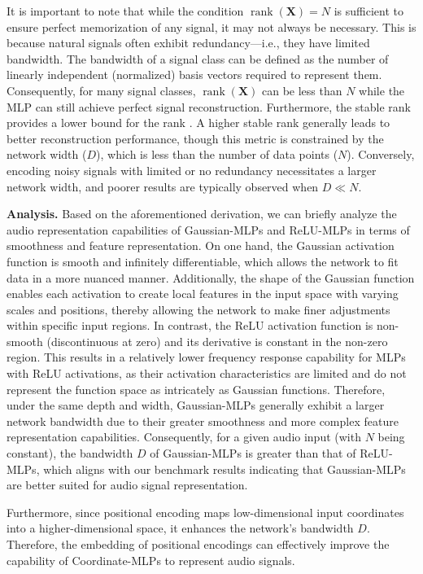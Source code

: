 \documentclass[letterpaper]{article} %
\begin{document}
It is important to note that while the condition \(\operatorname{rank}(\mathbf{X}) = N\) is sufficient to ensure perfect memorization of any signal, it may not always be necessary. This is because natural signals often exhibit redundancy—i.e., they have limited bandwidth. The bandwidth of a signal class can be defined as the number of linearly independent (normalized) basis vectors required to represent them. Consequently, for many signal classes, \(\operatorname{rank}(\mathbf{X})\) can be less than \(N\) while the MLP can still achieve perfect signal reconstruction. Furthermore, the stable rank provides a lower bound for the rank \cite{Rudelson2007rank}. A higher stable rank generally leads to better reconstruction performance, though this metric is constrained by the network width (\(D\)), which is less than the number of data points (\(N\)). Conversely, encoding noisy signals with limited or no redundancy necessitates a larger network width, and poorer results are typically observed when \(D \ll N\).

\textbf{Analysis.} Based on the aforementioned derivation, we can briefly analyze the audio representation capabilities of Gaussian-MLPs and ReLU-MLPs in terms of smoothness and feature representation. On one hand, the Gaussian activation function is smooth and infinitely differentiable, which allows the network to fit data in a more nuanced manner. Additionally, the shape of the Gaussian function enables each activation to create local features in the input space with varying scales and positions, thereby allowing the network to make finer adjustments within specific input regions. In contrast, the ReLU activation function is non-smooth (discontinuous at zero) and its derivative is constant in the non-zero region. This results in a relatively lower frequency response capability for MLPs with ReLU activations, as their activation characteristics are limited and do not represent the function space as intricately as Gaussian functions. Therefore, under the same depth and width, Gaussian-MLPs generally exhibit a larger network bandwidth due to their greater smoothness and more complex feature representation capabilities. Consequently, for a given audio input (with \( N \) being constant), the bandwidth \( D \) of Gaussian-MLPs is greater than that of ReLU-MLPs, which aligns with our benchmark results indicating that Gaussian-MLPs are better suited for audio signal representation.

Furthermore, since positional encoding maps low-dimensional input coordinates into a higher-dimensional space, it enhances the network's bandwidth $D$. Therefore, the embedding of positional encodings can effectively improve the capability of Coordinate-MLPs to represent audio signals.
\end{document}
